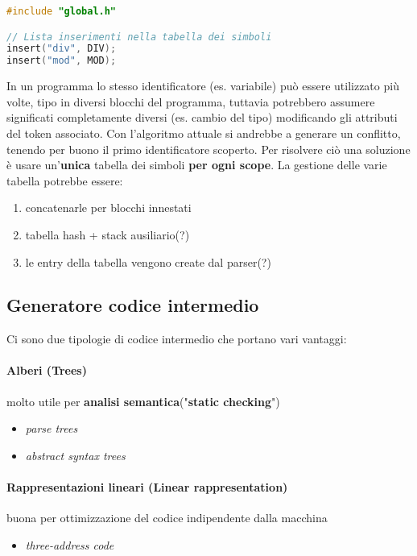 \begin{lstlisting}[language=C,caption=init.c]
#include "global.h"

// Lista inserimenti nella tabella dei simboli
insert("div", DIV);
insert("mod", MOD);
\end{lstlisting}

In un programma lo stesso identificatore (es. variabile) può essere utilizzato
più volte, tipo in diversi blocchi del programma, tuttavia potrebbero assumere
significati completamente diversi (es. cambio del tipo) modificando gli
attributi del token associato. Con l'algoritmo attuale si andrebbe a generare
un conflitto, tenendo per buono il primo identificatore scoperto. Per risolvere
ciò una soluzione è usare un'\textbf{unica} tabella dei simboli
\textbf{per ogni scope}. La gestione delle varie tabella potrebbe essere:
\begin{enumerate}
\item concatenarle per blocchi innestati
\item tabella hash + stack ausiliario(?)\label{soltwo}
\item le entry della tabella vengono create dal parser(?)\label{solthree}
\end{enumerate}

\subsection{Generatore codice intermedio}
\label{sec:generatore_codice_intermedio}
Ci sono due tipologie di codice intermedio che portano vari vantaggi:
\paragraph{Alberi (Trees)}
molto utile per \textbf{analisi semantica}("\textbf{static checking}")
\begin{itemize}
\item \textit{parse trees}
\item \textit{abstract syntax trees}
\end{itemize}

\paragraph{Rappresentazioni lineari (Linear rappresentation)}
buona per ottimizzazione del codice indipendente dalla macchina
\begin{itemize}
\item \textit{three-address code}
\end{itemize}


